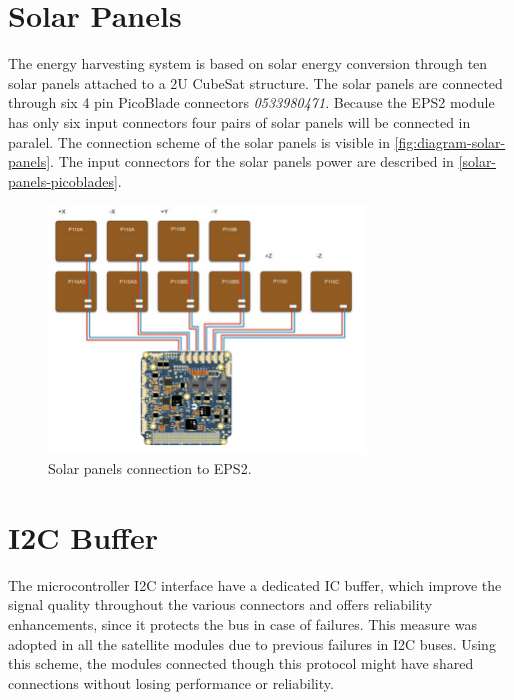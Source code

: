 \section{Solar Panels}

The energy harvesting system is based on solar energy conversion through ten solar panels attached to a 2U CubeSat structure. The solar panels are connected through six 4 pin PicoBlade connectors \textit{0533980471}. Because the EPS2 module has only six input connectors four pairs of solar panels will be connected in paralel. The connection scheme of the solar panels is visible in \autoref{fig:diagram-solar-panels}. The input connectors for the solar panels power are described in \autoref{solar-panels-picoblades}.
\begin{figure}[!ht]
    \begin{center}
        \includegraphics[width=0.75\textwidth]{figures/diagram-solar-panels.png}
        \caption{Solar panels connection to EPS2.}
        \label{fig:diagram-solar-panels}
    \end{center}
\end{figure}

\section{I2C Buffer}

The microcontroller I2C interface have a dedicated IC buffer, which improve the signal quality throughout the various connectors and offers reliability enhancements, since it protects the bus in case of failures. This measure was adopted in all the satellite modules due to previous failures in I2C buses. Using this scheme, the modules connected though this protocol might have shared connections without losing performance or reliability. 

